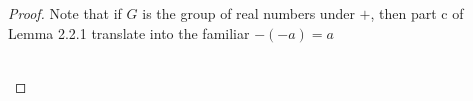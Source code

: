 \documentclass[12pt]{article}
\begin{document}
\begin{proof}
Note that if $G$ is the group of real numbers under $+$, then part c of Lemma 2.2.1 translate into the familiar $-(-a) = a$ \\ \\
\centerline{}
\end{proof}



 
\end{document}
